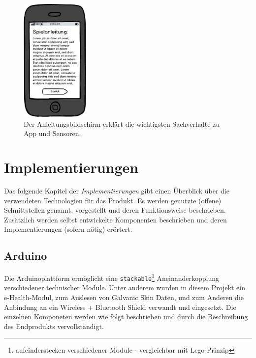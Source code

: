 \documentclass[10pt, a4paper, oneside, titlepage]{scrartcl} %
\begin{document}
	\newpage
	\begin{figure}[ht!]
		\begin{center}
			\includegraphics[width=0.3\textwidth]{mockup_13_instructions.png}
		\end{center}
		\caption[Mockup Anleitungsbildschirm]{Der Anleitungsbildschirm erklärt die wichtigsten Sachverhalte zu App und Sensoren.}
		\label{fig:mockup_13}
	\end{figure}	

   	
   	\newpage
	\section{Implementierungen}

	Das folgende Kapitel der \textit{Implementierungen} gibt einen Überblick über die verwendeten Technologien für das Produkt. Es werden genutzte (offene) Schnittstellen genannt, vorgestellt und deren Funktionsweise beschrieben. Zusätzlich werden selbst entwickelte Komponenten beschrieben und deren Implementierungen (sofern nötig) erörtert.
	
	\subsection{Arduino}
	
	Die Arduinoplattform ermöglicht eine \texttt{stackable}\footnote{aufeinderstecken verschiedener Module - vergleichbar mit Lego-Prinzip} Aneinanderkopplung verschiedener technischer Module. Unter anderem wurden in diesem Projekt ein e-Health-Modul, zum Auslesen von Galvanic Skin Daten, und zum Anderen die Anbindung an ein Wireless + Bluetooth Shield verwandt und eingesetzt. Die einzelnen Komponeten werden wie folgt beschrieben und durch die Beschreibung des Endprodukts vervollständigt.
		
\end{document}
